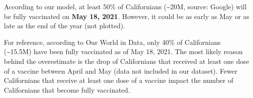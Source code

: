 \documentclass[]{article}
\begin{document}
According to our model, at least 50\% of Californians
(\textasciitilde{}20M, source: Google) will be fully vaccinated on
\textbf{May 18, 2021}. However, it could be as early as May or as late
as the end of the year (not plotted).

For reference, according to Our World in Data, only 40\% of Californians
(\textasciitilde{}15.5M) have been fully vaccinated as of May 18, 2021.
The most likely reason behind the overestimate is the drop of
Californians that received at least one dose of a vaccine between April
and May (data not included in our dataset). Fewer Californians that
receive at least one dose of a vaccine impact the number of Californians
that become fully vaccinated.
\end{document}
